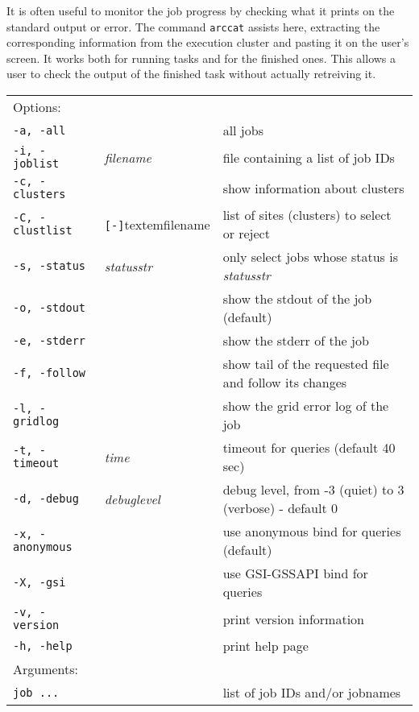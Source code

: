 It is often useful to monitor the job progress by checking what it
prints on the standard output or error. The command \texttt{arccat}
 assists here, extracting the
corresponding information from the execution cluster and pasting it
on the user's screen. It works both for running tasks and for the
finished ones. This allows a user to check the output of the
finished task without actually retreiving it.

\hspace*{0.5cm}
\begin{shaded}
\end{shaded}
\begin{longtable}{llp{8cm}}
   Options:&&\\
   \texttt{-a, -all}& & all jobs\\
   \texttt{-i, -joblist}& \textit{filename} & file containing a list of job IDs\\
   \texttt{-c, -clusters}& & show information about clusters\\
   \texttt{-C, -clustlist}&\verb#[-]#textem{filename}&list of sites (clusters) to select or reject\\
   \texttt{-s, -status}& \textit{statusstr} &only select jobs whose status is \textit{statusstr}\\
   \texttt{-o, -stdout}& & show the stdout of the job (default)\\
   \texttt{-e, -stderr}& & show the stderr of the job\\
   \texttt{-f, -follow}& & show tail of the requested file and follow its changes\\
   \texttt{-l, -gridlog}& & show the grid error log of the job\\
   \texttt{-t, -timeout}& \textit{time} & timeout for queries (default 40 sec)\\
   \texttt{-d, -debug}& \textit{debuglevel} &debug level, from -3 (quiet) to 3 (verbose) - default 0\\
   \texttt{-x, -anonymous}& & use anonymous bind for queries (default)\\
   \texttt{-X, -gsi}& & use GSI-GSSAPI bind for queries\\
   \texttt{-v, -version}& & print version information\\
   \texttt{-h, -help}& & print help page\\
   Arguments:&&\\
   \texttt{job ...} && list of job IDs and/or jobnames\\
\end{longtable}

